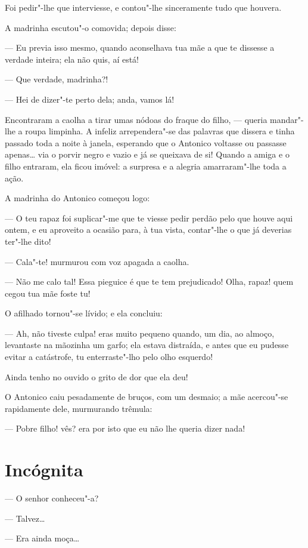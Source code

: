 Foi pedir"-lhe que interviesse, e contou"-lhe sinceramente tudo que
houvera.

A madrinha escutou"-o comovida; depois disse:

--- Eu previa isso mesmo, quando aconselhava tua mãe a que te dissesse a
verdade inteira; ela não quis, aí está!

--- Que verdade, madrinha?!

--- Hei de dizer"-te perto dela; anda, vamos lá!

Encontraram a caolha a tirar umas nódoas do fraque do filho, --- queria
mandar"-lhe a roupa limpinha. A infeliz arrependera"-se das palavras que
dissera e tinha passado toda a noite à janela, esperando que o Antonico
voltasse ou passasse apenas\ldots{} via o porvir negro e vazio e já se
queixava de si! Quando a amiga e o filho entraram, ela ficou imóvel: a
surpresa e a alegria amarraram"-lhe toda a ação.

A madrinha do Antonico começou logo:

--- O teu rapaz foi suplicar"-me que te viesse pedir perdão pelo que
houve aqui ontem, e eu aproveito a ocasião para, à tua vista, contar"-lhe
o que já deverias ter"-lhe dito!

--- Cala"-te! murmurou com voz apagada a caolha.

--- Não me calo tal! Essa pieguice é que te tem prejudicado! Olha,
rapaz! quem cegou tua mãe foste tu!

O afilhado tornou"-se lívido; e ela concluiu:

--- Ah, não tiveste culpa! eras muito pequeno quando, um dia, ao almoço,
levantaste na mãozinha um garfo; ela estava distraída, e antes que eu
pudesse evitar a catástrofe, tu enterraste"-lho pelo olho esquerdo!

Ainda tenho no ouvido o grito de dor que ela deu!

O Antonico caiu pesadamente de bruços, com um desmaio; a mãe acercou"-se
rapidamente dele, murmurando trêmula:

--- Pobre filho! vês? era por isto que eu não lhe queria dizer nada!

\chapter{Incógnita}

--- O senhor conheceu"-a?

--- Talvez\ldots{}

--- Era ainda moça\ldots{}

